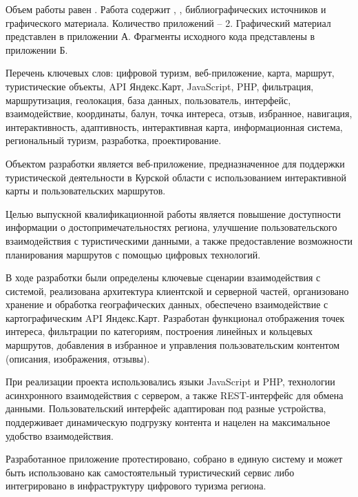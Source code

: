 
Объем работы равен . Работа содержит , ,  библиографических источников и  графического материала. Количество приложений – 2. Графический материал представлен в приложении А. Фрагменты исходного кода представлены в приложении Б.

Перечень ключевых слов: цифровой туризм, веб-приложение, карта, маршрут, туристические объекты, API Яндекс.Карт, JavaScript, PHP, фильтрация, маршрутизация, геолокация, база данных, пользователь, интерфейс, взаимодействие, координаты, балун, точка интереса, отзыв, избранное, навигация, интерактивность, адаптивность, интерактивная карта, информационная система, региональный туризм, разработка, проектирование.

Объектом разработки является веб-приложение, предназначенное для поддержки туристической деятельности в Курской области с использованием интерактивной карты и пользовательских маршрутов.

Целью выпускной квалификационной работы является повышение доступности информации о достопримечательностях региона, улучшение пользовательского взаимодействия с туристическими данными, а также предоставление возможности планирования маршрутов с помощью цифровых технологий.

В ходе разработки были определены ключевые сценарии взаимодействия с системой, реализована архитектура клиентской и серверной частей, организовано хранение и обработка географических данных, обеспечено взаимодействие с картографическим API Яндекс.Карт. Разработан функционал отображения точек интереса, фильтрации по категориям, построения линейных и кольцевых маршрутов, добавления в избранное и управления пользовательским контентом (описания, изображения, отзывы).

При реализации проекта использовались языки JavaScript и PHP, технологии асинхронного взаимодействия с сервером, а также REST-интерфейс для обмена данными. Пользовательский интерфейс адаптирован под разные устройства, поддерживает динамическую подгрузку контента и нацелен на максимальное удобство взаимодействия.

Разработанное приложение протестировано, собрано в единую систему и может быть использовано как самостоятельный туристический сервис либо интегрировано в инфраструктуру цифрового туризма региона.

